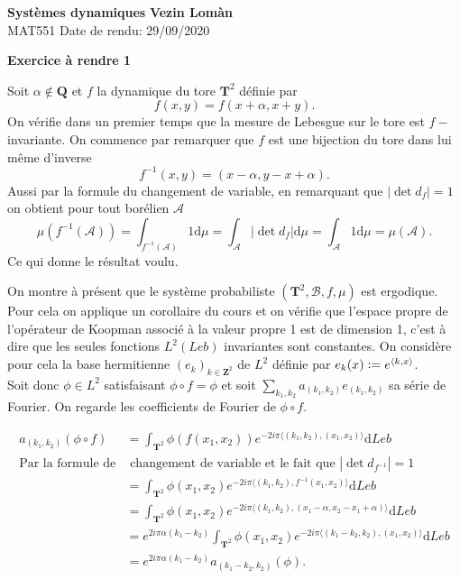 \documentclass[12pt]{article}
\newcommand{\defeq}{\vcentcolon=}
\newcommand{\Z}{\mathbf{Z}}
\newcommand{\Q}{\mathbf{Q}}
\newcommand{\T}{\mathbf{T}}
\newcommand{\de}{\mathrm{d}}
\begin{document}
        \noindent
\textbf{Systèmes dynamiques} \hfill \textbf{Vezin Lomàn}\\
\normalsize MAT551  \hfill Date de rendu: 29/09/2020\\

\begin{center}
\textbf{Exercice à rendre 1}
\end{center}
        
Soit $\alpha \not\in \Q$ et $f$ la dynamique du tore $\T^{2}$ définie par \[
        f(x, y) = f(x+\alpha, x + y)
.\]  
On vérifie dans un premier temps que la mesure de Lebesgue sur le tore est $f-$invariante. On commence par remarquer que $f$ est une bijection du tore dans lui même d'inverse  \[
        f^{-1}(x, y) = (x - \alpha, y - x + \alpha)
        .\] 
        Aussi par la formule du changement de variable, en remarquant que $|\det d_{f}| = 1$ on obtient pour tout borélien $\mathcal{A}$ \[
        \mu(f^{-1}(\mathcal{A})) = \int_{f^{-1}(\mathcal{A})}1 \de\mu = \int_{\mathcal{A}} |\det d_{f}|\de\mu = \int_{\mathcal{A}}1\de\mu = \mu(\mathcal{A}).\] Ce qui donne le résultat voulu.

        \bigskip

        On montre à présent que le système probabiliste $(\T^{2}, \mathcal{B}, f, \mu)$ est ergodique. \\
        Pour cela on applique un corollaire du cours et on vérifie que l'espace propre de l'opérateur de Koopman associé à la valeur propre 1 est de dimension 1, c'est à dire que les seules fonctions $L^{2}(Leb)$ invariantes sont constantes. On considère pour cela la base hermitienne $(e_{k})_{k \in \Z^{2}}$ de $L^{2}$ définie par $e_{k}(x) \defeq e^{\langle k, x \rangle}$. \\

        Soit donc $\phi \in L^{2}$ satisfaisant $\phi \circ f = \phi$ et soit $\sum_{k_1, k_2} a_{(k_1, k_2)}e_{(k_1, k_2)}$ sa série de Fourier. On regarde les coefficients de Fourier de $\phi \circ f$.
        
        \begin{align*}
                a_{(k_1, k_2)}(\phi \circ f) &= \int_{\T^{2}}\phi(f(x_{1}, x_{2}))e^{-2i\pi \langle (k_1, k_2), (x_1, x_2) \rangle} \de Leb \\
                \text{Par la formule de} & \text{ changement de variable et le fait que } |\det d_{f^{-1}}| = 1 \\
                                         &= \int_{\T^{2}} \phi(x_1, x_2)e^{-2i\pi \langle(k_1, k_2), f^{-1}(x_1, x_2) \rangle} \de Leb \\
                                         &= \int_{\T^{2}} \phi(x_1, x_2)e^{-2i\pi \langle(k_1, k_2), (x_1 - \alpha, x_2 - x_1 + \alpha) \rangle} \de Leb \\
                                 &= e^{2i\pi\alpha(k_1-k_2)} \int_{\T^{2}} \phi(x_1, x_2)e^{-2i\pi \langle (k_1 - k_2, k_2), (x_1, x_2) \rangle} \de Leb \\
                                 &= e^{2i\pi\alpha(k_1-k_2)} a_{(k_1-k_2, k_2)}(\phi) 
        .\end{align*}
\end{document}

